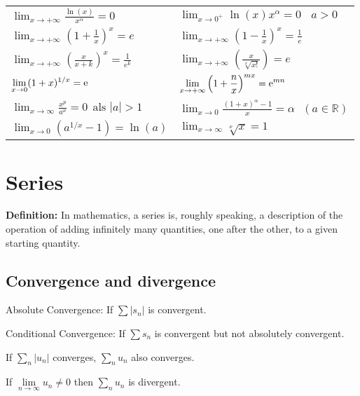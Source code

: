 \begin{tabularx}{\textwidth}{ X X }
$ \displaystyle
\lim_{x\rightarrow+\infty}\frac{\ln(x)}{x^\alpha}=0 $ &
$ \displaystyle \lim_{x\rightarrow 0^+}\ln(x)x^\alpha=0 ~~~~ a>0 $ \\ [2ex]


$ \displaystyle \lim_{x\rightarrow+\infty}\left(1+\frac{1}{x}\right)^x=e $ & 
$ \displaystyle \lim_{x\rightarrow+\infty}\left(1-\frac{1}{x}\right)^x=\frac{1}{e} $ \\ [2ex]

$ \displaystyle \lim_{x\rightarrow+\infty}\left(\frac{x}{x+k}\right)^x=\frac{1}{e^k} $ & 
$ \displaystyle \lim_{x\rightarrow+\infty}\left(\frac{x}{ \sqrt[x]{x!} }\right)=e $ \\ [2ex]

$ \displaystyle \lim_{x\rightarrow0}(1+x)^{1/x}={\rm e} $ &
$ \displaystyle \lim_{x\rightarrow+\infty}\left(1+\frac{n}{x}\right)^{mx}={\rm e}^{mn} $ \\ [2ex]

$ \displaystyle \lim_{x\rightarrow\infty}\frac{x^p}{a^x}=0~~\mbox{als }|a|>1 $ &
$ \displaystyle \lim_{x\rightarrow0}\frac{(1+x)^\alpha-1}{x}=\alpha ~~~ (a\in\mathbb{R}) $ \\ [2ex]

$ \displaystyle \lim_{x\rightarrow0}\left(a^{1/x}-1\right)=\ln(a) $ &
$ \displaystyle \lim_{x\rightarrow\infty}\sqrt[x]{x}=1 $ \\ [2ex]

\end{tabularx}

\section{Series}
\textbf{Definition:} In mathematics, a series is, roughly speaking, a description of the operation of adding infinitely many quantities, one after the other, to a given starting quantity.

\subsection{Convergence and divergence}
Absolute Convergence: If $\sum\left|s_n\right|$ is convergent.

Conditional Convergence: If $\sum s_n$ is convergent but not absolutely convergent.

If $\sum\limits_n|u_n|$ converges, $\sum\limits_n u_n$ also converges.

If $\lim\limits_{n\rightarrow\infty}u_n\neq0$ then $\sum\limits_n u_n$ is divergent.

